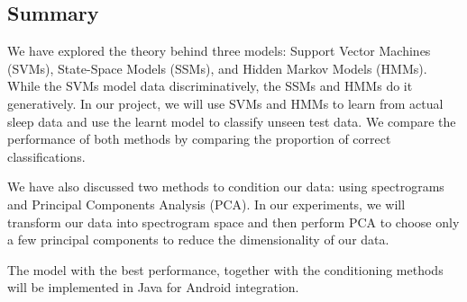 \subsection{Summary}
	We have explored the theory behind three models: Support Vector Machines (SVMs), State-Space Models (SSMs), and Hidden Markov Models (HMMs). While the SVMs model data discriminatively, the SSMs and HMMs do it generatively. In our project, we will use SVMs and HMMs to learn from actual sleep data and use the learnt model to classify unseen test data. We compare the performance of both methods by comparing the proportion of correct classifications.

	We have also discussed two methods to condition our data: using spectrograms and Principal Components Analysis (PCA). In our experiments, we will transform our data into spectrogram space and then perform PCA to choose only a few principal components to reduce the dimensionality of our data.

	The model with the best performance, together with the conditioning methods will be implemented in Java for Android integration.